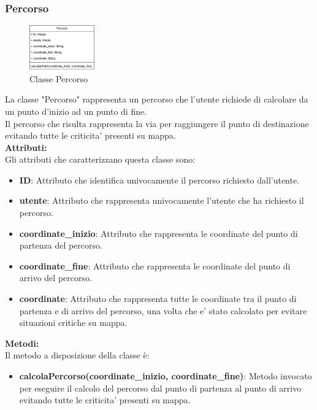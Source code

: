 \documentclass{article}
\begin{document}
\clearpage 

\subsubsection{Percorso}

\begin{figure}[htbp]
    \centering
    \includegraphics[width=0.25\textwidth]{Images/percorso_class.png}
    \caption{Classe Percorso}
    \label{fig:percorso}
\end{figure}

La classe "Percorso" rappresenta un percorso che l'utente richiede di calcolare da un punto d'inizio ad un punto di fine.\\
Il percorso che risulta rappresenta la via per raggiungere il punto di destinazione evitando tutte le criticita' presenti su mappa.\\

\textbf{Attributi:}\\
Gli attributi che caratterizzano questa classe sono:
\begin{itemize}
    \item \textbf{ID}: Attributo che identifica univocamente il percorso richiesto dall'utente.
    \item \textbf{utente}: Attributo che rappresenta univocamente l'utente che ha richiesto il percorso.
    \item \textbf{coordinate\_inizio}: Attributo che rappresenta le coordinate del punto di partenza del percorso.
    \item \textbf{coordinate\_fine}: Attributo che rappresenta le coordinate del punto di arrivo del percorso.
    \item \textbf{coordinate}: Attributo che rappresenta tutte le coordinate tra il punto di partenza e di arrivo del percorso, una volta che e' stato calcolato per evitare situazioni critiche su mappa.
\end{itemize}

\textbf{Metodi:}\\
Il metodo a disposizione della classe è:
\begin{itemize}
    \item \textbf{calcolaPercorso(coordinate\_inizio, coordinate\_fine)}: Metodo invocato per eseguire il calcolo del percorso dal punto di partenza al punto di arrivo evitando tutte le criticita' presenti su mappa.
\end{itemize}
\end{document}
